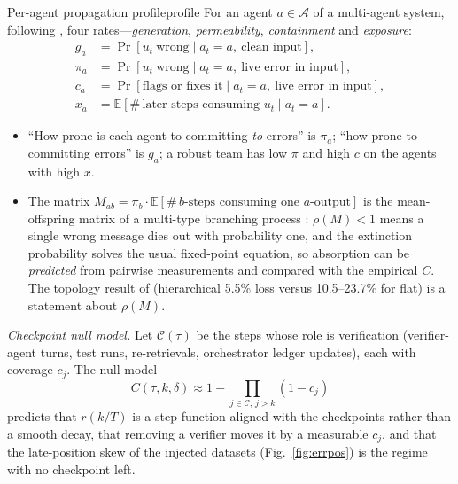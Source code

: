 \begin{definition}{Per-agent propagation profile}{profile}
For an agent $a\in\mathcal{A}$ of a multi-agent system, following \cite{hiller2004epic}, four rates---\emph{generation}, \emph{permeability}, \emph{containment} and \emph{exposure}:
\begin{align*}
g_a&=\Pr[u_t\ \text{wrong}\mid a_t{=}a,\ \text{clean input}],\\
\pi_a&=\Pr[u_t\ \text{wrong}\mid a_t{=}a,\ \text{live error in input}],\\
c_a&=\Pr[\text{flags or fixes it}\mid a_t{=}a,\ \text{live error in input}],\\
x_a&=\mathbb{E}[\#\,\text{later steps consuming }u_t\mid a_t{=}a].
\end{align*}
\begin{itemize}[leftmargin=1.1em]
\item ``How prone is each agent to committing \emph{to} errors'' is $\pi_a$; ``how prone to committing errors'' is $g_a$; a robust team has low $\pi$ and high $c$ on the agents with high $x$.
\item The matrix $M_{ab}=\pi_b\cdot\mathbb{E}[\#\,b\text{-steps consuming one }a\text{-output}]$ is the mean-offspring matrix of a multi-type branching process \cite{harris1963branching}: $\rho(M)<1$ means a single wrong message dies out with probability one, and the extinction probability solves the usual fixed-point equation, so absorption can be \emph{predicted} from pairwise measurements and compared with the empirical $C$. The topology result of \citet{huang2024resilience} (hierarchical 5.5\% loss versus 10.5--23.7\% for flat) is a statement about $\rho(M)$.
\end{itemize}
\end{definition}

\emph{Checkpoint null model.} Let $\mathcal{C}(\tau)$ be the steps whose role is verification (verifier-agent turns, test runs, re-retrievals, orchestrator ledger updates), each with coverage $c_j$. The null model
\[C(\tau,k,\delta)\approx1-\textstyle\prod_{j\in\mathcal{C},\,j>k}(1-c_j)\]
predicts that $r(k/T)$ is a step function aligned with the checkpoints rather than a smooth decay, that removing a verifier moves it by a measurable $c_j$, and that the late-position skew of the injected datasets (Fig.~\ref{fig:errpos}) is the regime with no checkpoint left.

